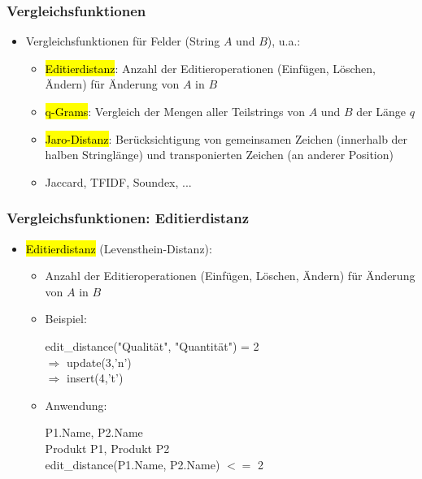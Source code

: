     
    \begin{frame}
    \frametitle{Vergleichsfunktionen}
    
    \begin{itemize}
    \item Vergleichsfunktionen für Felder (String $A$ und $B$), u.a.:
    \begin{itemize}
    \item \hl{Editierdistanz}: Anzahl der Editieroperationen (Einfügen,
      Löschen, Ändern) für Änderung von $A$ in $B$ 
    \item \hl{q-Grams}: Vergleich der Mengen aller Teilstrings von $A$ und $B$
      der Länge $q$ 
    \item \hl{Jaro-Distanz}: Berücksichtigung von gemeinsamen Zeichen
      (innerhalb der halben Stringlänge) und transponierten Zeichen (an
      anderer Position) 
    \item Jaccard, TFIDF, Soundex, ...
    \end{itemize}
    \end{itemize}
    
    \end{frame}
    
    \begin{frame}
    \frametitle{Vergleichsfunktionen: Editierdistanz}
    
    \begin{itemize}
    \item \hl{Editierdistanz} (Levensthein-Distanz):
    \begin{itemize}
    \item Anzahl der Editieroperationen (Einfügen, Löschen, Ändern) für
      Änderung von $A$ in $B$  
    \item Beispiel:
    \hspace*{-1cm}\begin{sql}
    edit\_distance("Qualität", "Quantität") = 2 \\
    \1 $\Rightarrow$ update(3,'n') \\
    \1 $\Rightarrow$ insert(4,'t')
    \end{sql}
    \item Anwendung:
    \hspace*{-1cm}\begin{sql}
     P1.Name, P2.Name \\
     Produkt P1, Produkt P2 \\
     edit\_distance(P1.Name, P2.Name) $<=$ 2
    \end{sql}
    \end{itemize}
    \end{itemize}
    
    \end{frame}
    

